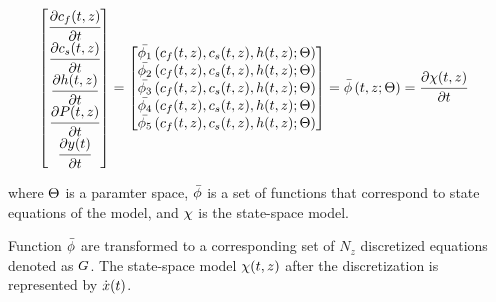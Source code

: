 \documentclass[../Article_Sensitivity_Analsysis.tex]{subfiles}
\begin{document}
		{\footnotesize
			\begin{align}
				\begin{bmatrix}
					\cfrac{\partial {\color{black}c_f}(t,z)}{\partial t}\\
					\cfrac{\partial {\color{black}c_s}(t,z)}{\partial t}\\
					\cfrac{\partial {\color{black}h}(t,z)}{\partial t} \\
					\cfrac{\partial {\color{black}P}(t,z)}{\partial t} \\
					\cfrac{\partial {\color{black}y}(t)}{\partial t} 
				\end{bmatrix}
				& =
				\begin{bmatrix}
					{\color{black}\bar{\phi_1}} \left( {\color{black}c_f}(t,z),{\color{black}c_s}(t,z),{\color{black}h}(t,z); {\color{black}\Theta} \right)\\
					{\color{black}\bar{\phi_2}} \left( {\color{black}c_f}(t,z),{\color{black}c_s}(t,z),{\color{black}h}(t,z); {\color{black}\Theta} \right)\\
					{\color{black}\bar{\phi_3}} \left( {\color{black}c_f}(t,z),{\color{black}c_s}(t,z),{\color{black}h}(t,z); {\color{black}\Theta} \right) \\
					{\color{black}\bar{\phi_4}} \left( {\color{black}c_f}(t,z),{\color{black}c_s}(t,z),{\color{black}h}(t,z); {\color{black}\Theta} \right)\\
					{\color{black}\bar{\phi_5}} \left( {\color{black}c_f}(t,z),{\color{black}c_s}(t,z),{\color{black}h}(t,z); {\color{black}\Theta} \right)
				\end{bmatrix} = {\color{black}\bar{\phi}} \left( t,z; {\color{black}\Theta} \right) = \cfrac{\partial {\color{black}\chi}(t,z)}{\partial t}
		\end{align} }
			
		where ${\color{black}\Theta}$ is a paramter space, ${\color{black}\bar{\phi}}$ is a set of functions that correspond to state equations of the model, and ${\color{black}\chi}$ is the state-space model.
		
		Function ${\color{black}\bar{\phi}}$ are transformed to a corresponding set of $N_z$ discretized equations denoted as ${\color{black}G}$. The state-space model ${\color{black}\chi}(t,z)$ after the discretization is represented by $\dot{{\color{black}x}}(t)$.
			
\end{document}
